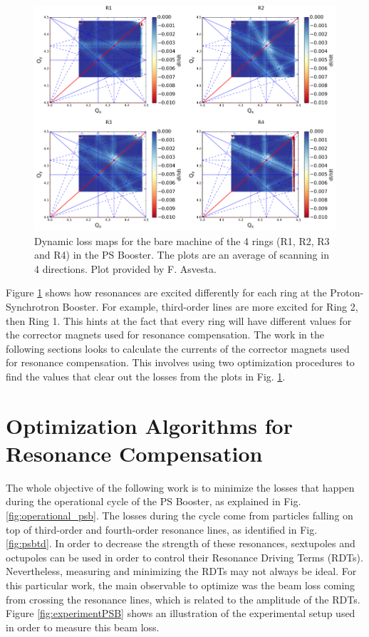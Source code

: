 \begin{figure}[H]
    \centering
    \includegraphics[width=\columnwidth]{chapter5/bare.png}
    \caption{Dynamic loss maps for the bare machine of the 4 rings (R1, R2, R3 and R4) in the PS Booster. The plots are an average of scanning in 4 directions. Plot provided by F. Asvesta.}
    \label{fig:bare_psb}
\end{figure}

Figure \ref{fig:bare_psb} shows how resonances are excited differently for each ring at the Proton-Synchrotron Booster. For example, third-order lines are more excited for Ring 2, then Ring 1. This hints at the fact that every ring will have different values for the corrector magnets used for resonance compensation. The work in the following sections looks to calculate the currents of the corrector magnets used for resonance compensation. This involves using two optimization procedures to find the values that clear out the losses from the plots in Fig. \ref{fig:bare_psb}.

\section{Optimization Algorithms for Resonance Compensation}

The whole objective of the following work is to minimize the losses that happen during the operational cycle of the PS Booster, as explained in Fig. \ref{fig:operational_psb}. The losses during the cycle come from particles falling on top of third-order and fourth-order resonance lines, as identified in Fig. \ref{fig:psbtd}. In order to decrease the strength of these resonances, sextupoles and octupoles can be used in order to control their Resonance Driving Terms (RDTs). Nevertheless, measuring and minimizing the RDTs may not always be ideal. For this particular work, the main observable to optimize was the beam loss coming from crossing the resonance lines, which is related to the amplitude of the RDTs. Figure \ref{fig:experimentPSB} shows an illustration of the experimental setup used in order to measure this beam loss.

